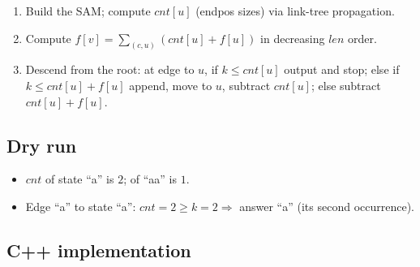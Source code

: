 \begin{enumerate}
  \item Build the SAM; compute $\textit{cnt}[u]$ (endpos sizes) via
        link-tree propagation.
  \item Compute $f[v]=\sum_{(c,u)}(\textit{cnt}[u]+f[u])$ in decreasing
        $\textit{len}$ order.
  \item Descend from the root: at edge to $u$, if $k\le\textit{cnt}[u]$
        output and stop; else if $k\le\textit{cnt}[u]+f[u]$ append, move to
        $u$, subtract $\textit{cnt}[u]$; else subtract $\textit{cnt}[u]+
        f[u]$.
\end{enumerate}

\subsection*{Dry run}


\begin{itemize}
  \item $\textit{cnt}$ of state ``a'' is $2$; of ``aa'' is $1$.
  \item Edge ``a'' to state ``a'': $\textit{cnt}=2\ge k=2\Rightarrow$
        answer ``a'' (its second occurrence).
\end{itemize}

\subsection*{C++ implementation}

